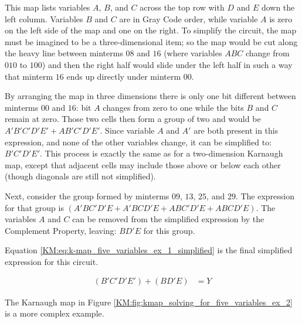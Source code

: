 This map lists variables $ A $, $ B $, and $ C $ across the top row with $ D $ and $ E $ down the left column. Variables $ B $ and $ C $ are in Gray Code order, while variable $ A $ is zero on the left side of the map and one on the right. To simplify the circuit, the map must be imagined to be a three-dimensional item; so the map would be cut along the heavy line between minterms $ 08 $ and $ 16 $ (where variables $ ABC $ change from $ 010 $ to $ 100 $) and then the right half would slide under the left half in such a way that minterm $ 16 $ ends up directly under minterm $ 00 $. 

By arranging the map in three dimensions there is only one bit different between minterms $ 00 $ and $ 16 $: bit $ A $ changes from zero to one while the bits $ B $ and $ C $ remain at zero. Those two cells then form a group of two and would be $ A'B'C'D'E'+AB'C'D'E' $. Since variable $ A $ and $ A' $ are both present in this expression, and none of the other variables change, it can be simplified to: $ B'C'D'E' $. This process is exactly the same as for a two-dimension Karnaugh map, except that adjacent cells may include those above or below each other (though diagonals are still not simplified).

Next, consider the group formed by minterms $ 09 $, $ 13 $, $ 25 $, and $ 29 $. The expression for that group is $ (A'BC'D'E+A'BCD'E+ABC'D'E+ABCD'E) $. The variables $ A $ and $ C $ can be removed from the simplified expression by the Complement Property, leaving: $ BD'E $ for this group.

Equation \ref{KM:eq:k-map_five_variables_ex_1_simplified} is the final simplified expression for this circuit.

\begin{align}
  \label{KM:eq:k-map_five_variables_ex_1_simplified}
  (B'C'D'E')+(BD'E) &= Y
\end{align}

The Karnaugh map in Figure \ref{KM:fig:kmap_solving_for_five_variables_ex_2} is a more complex example.

